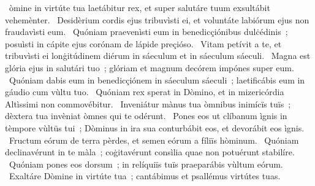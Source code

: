 { }
{%
~òmine in virtúte tua laetábitur rex, et super salutáre tuum exsultábit vehemènter. 
~Desidèrium cordis ejus tribuvìsti ei, et voluntáte labiórum ejus non fraudavìsti eum. 
~Quóniam praevenìsti eum in benedicçiónibus dulċédinis~; posuìsti in cápite ejus corónam de lápide preçióso. 
~Vitam petívit a te, et tribuvìsti ei lonġitúdinem diérum in sáeculum et in sáeculum sáeculi. 
~Magna est glória ejus in salutári tuo~; glóriam et magnum decórem impónes super eum. 
~Quóniam dabis eum in benedicçiónem in sáeculum sáeculi~; laetificábis eum in gáudio cum vùltu tuo. 
~Quóniam rex sperat in Dòmino, et in mizericórdia Altìssimi non commovébitur. 
~Inveniátur mànus tua òmnibus inimícïs tuïs~; dèxtera tua invèniat òmnes qui te odérunt. 
~Pones eos ut clíbanum ìgnis in tèmpore vùltüs tui~; Dòminus in ira sua conturbábit eos, et devorábit eos ìgnis. 
~Fructum eórum de terra pèrdes, et semen eórum a fíliïs hòminum. 
~Quóniam declinavérunt in te màla~; coġitavérunt consìlia quae non potuérunt stabilíre. 
~Quóniam pones eos dorsum~; in relíquiïs tuïs praeparábis vùltum eórum. 
~Exaltáre Dòmine in virtúte tua~; cantábimus et psallémus virtútes tuas. 
}
